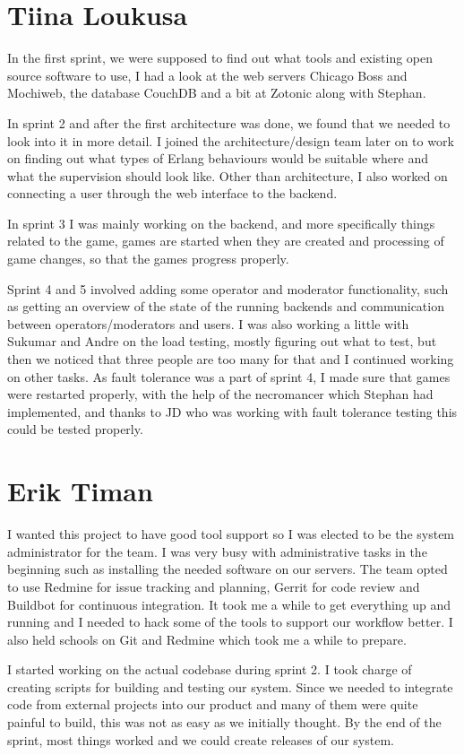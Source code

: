 \documentclass[11pt,a4paper]{report}
\begin{document}
\section{Tiina Loukusa}
In the first sprint, we were supposed to find out what tools and existing
open source software to use, I had a look at the web servers Chicago Boss and
Mochiweb, the database CouchDB and a bit at Zotonic along with Stephan.

In sprint 2 and after the first architecture was done, we found that we
needed to look into it in more detail. I joined the architecture/design team
later on to work on finding out what types of Erlang behaviours would be
suitable where and what the supervision should look like. Other than
architecture, I also worked on connecting a user through the web interface to
the backend.

In sprint 3 I was mainly working on the backend, and more specifically things
related to the game, games are started when they are created and processing of
game changes, so that the games progress properly.

Sprint 4 and 5 involved adding some operator and moderator functionality, such
as getting an overview of the state of the running backends and communication
between operators/moderators and users. I was also working a little with Sukumar
and Andre on the load testing, mostly figuring out what to test, but then we
noticed that three people are too many for that and I continued working on other
tasks.
As fault tolerance was a part of sprint 4, I made sure that games were restarted
properly, with the help of the necromancer which Stephan had implemented, and
thanks to JD who was working with fault tolerance testing this could be tested
properly.
\section{Erik Timan}
I wanted this project to have good tool support so I was elected to be the
system administrator for the team. I was very busy with administrative tasks in
the beginning such as installing the needed software on our servers. The team
opted to use Redmine for issue tracking and planning, Gerrit for code review and
Buildbot for continuous integration. It took me a while to get everything up and
running and I needed to hack some of the tools to support our workflow better. I
also held schools on Git and Redmine which took me a while to prepare.

I started working on the actual codebase during sprint 2. I took charge of
creating scripts for building and testing our system. Since we needed to
integrate code from external projects into our product and many of them were
quite painful to build, this was not as easy as we initially thought. By the end
of the sprint, most things worked and we could create releases of our system.
\end{document}
